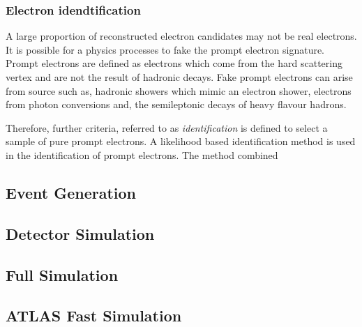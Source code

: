 \subsubsection{Electron idendtification}
A large proportion of reconstructed electron candidates may not be real electrons. It is possible for a physics processes to fake the prompt electron signature. Prompt electrons are defined as electrons which come from the hard scattering vertex and are not the result of hadronic decays. Fake prompt electrons can arise from source such as, hadronic showers which mimic an electron shower, electrons from photon conversions and, the semileptonic decays of heavy flavour hadrons.

Therefore, further criteria, referred to as \emph{identification} is defined to select a sample of pure prompt electrons. A likelihood based identification method is used in the identification of prompt electrons. The method combined 

\subsection{Event Generation}

\subsection{Detector Simulation}

\subsection{Full Simulation}

\subsection{ATLAS Fast Simulation}


